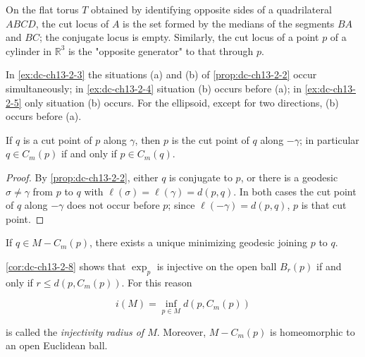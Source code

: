 \begin{example}
  \label{ex:dc-ch13-2-5}
  On the flat torus $T$ obtained by identifying opposite sides of a quadrilateral
  $ABCD$, the cut locus of $A$ is the set formed by the medians of the segments $BA$
  and $BC$; the conjugate locus is empty. Similarly, the cut locus of a point $p$ of
  a cylinder in $\mathbb{R}^3$ is the "opposite generator" to that through $p$.
\end{example}

\begin{remark}
  \label{rem:dc-ch13-2-6}
  In \cref{ex:dc-ch13-2-3} the situations (a) and (b) of \cref{prop:dc-ch13-2-2} occur simultaneously;
  in \cref{ex:dc-ch13-2-4} situation (b) occurs before (a); in \cref{ex:dc-ch13-2-5} only situation (b)
  occurs. For the ellipsoid, except for two directions, (b) occurs before (a).
\end{remark}

\begin{corollary}
  \label{cor:dc-ch13-2-7}
  If $q$ is a cut point of $p$ along $\gamma$, then $p$ is the cut point of $q$ along
  $-\gamma$; in particular $q\in C_m(p)$ if and only if $p\in C_m(q)$.
\end{corollary}
\begin{proof}
\sketch
  By \cref{prop:dc-ch13-2-2}, either $q$ is conjugate to $p$, or there is a geodesic
  $\sigma\neq\gamma$ from $p$ to $q$ with $\ell(\sigma)=\ell(\gamma)=d(p,q)$. In both
  cases the cut point of $q$ along $-\gamma$ does not occur before $p$; since
  $\ell(-\gamma)=d(p,q)$, $p$ is that cut point.
\end{proof}

\begin{corollary}
  \label{cor:dc-ch13-2-8}
  If $q\in M-C_m(p)$, there exists a unique minimizing geodesic joining $p$ to $q$.

  \cref{cor:dc-ch13-2-8} shows that $\exp_p$ is injective on the open ball $B_r(p)$ if and only
  if $r\leq d(p,C_m(p))$. For this reason

  $$
  i(M)=\inf_{p\in M}d(p,C_m(p))
  $$

  is called the \emph{injectivity radius of $M$}. Moreover, $M-C_m(p)$ is
  homeomorphic to an open Euclidean ball.
\end{corollary}

